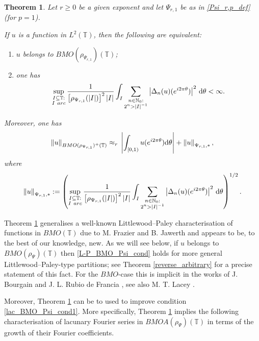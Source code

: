 \documentclass[a4paper, leqno, 10pt]{amsart}
\numberwithin{equation}{section}
\newtheorem{theo}[thm]{Theorem}
\newcommand{\dd}{\mathrm{d}}
\newcommand{\T}{\mathbb{T}}
\newcommand{\norm}[1]{\left\Vert#1\right\Vert}
\newcommand{\abs}[1]{\left|#1\right|}
\newcommand{\N}{\mathbb{N}}
\begin{document}
\begin{theo}\label{LP_BMO_Psi} Let $r \geq 0$ be a given exponent and let $\Psi_{r,1}$ be as in \eqref{Psi_r,p_def} (for $p=1$).  

If $u $ is a function in $ L^2 (\T)$, then the following are equivalent:
\begin{enumerate}
\item $u$ belongs to $BMO (\rho_{\Psi_{r,1}}) (\T)$;
\item one has
\begin{equation}\label{L-P_BMO_Psi_cond}
\sup_{\substack{I \subseteq \T: \\ I \ {\rm arc}}} \frac{1} { \left[ \rho_{\Psi_{r,1}} (|I|) \right]^2 |I|} \int_I \sum_{\substack{n \in \N_0: \\ 2^n > |I|^{-1}}} \left| \Delta_n (u) (e^{i 2 \pi \theta}) \right|^2 \, \dd \theta < \infty.
\end{equation}
\end{enumerate}
Moreover, one has 
\begin{equation}\label{equiv_norm_L-P_BMO_Psi}
\norm{u}_{BMO(\rho_{\Psi_{r,1}})^+ (\T)} \approx_{r} \\ \abs{ \int_{[0,1)} u (e^{i 2 \pi \theta}) \dd \theta} + \norm{u}_{\Psi_{r,1}, \ast} ,
\end{equation}
where
\[ 
\norm{u}_{\Psi_{r,1}, \ast}:= \left( \sup_{\substack{I \subseteq \T: \\ I \ {\rm arc}}} \frac{1} { \left[ \rho_{\Psi_{r,1}} (|I|) \right]^2 |I|} \int_I \sum_{\substack{n \in \N_0: \\ 2^n > |I|^{-1}}}  \left| \Delta_n (u) (e^{i 2 \pi \theta}) \right|^2 \, \dd \theta \right)^{1/2}.
\]
\end{theo}

Theorem \ref{LP_BMO_Psi} generalises a well-known Littlewood--Paley characterisation of functions in $BMO (\T)$ due to M. Frazier and B. Jawerth \cite{FJ} and appears to be, to the best of our knowledge, new. As we will see below, if $u$ belongs to $BMO (\rho_{\Psi}) (\T)$ then \eqref{L-P_BMO_Psi_cond} holds %
for more general Littlewood--Paley-type partitions; see  Theorem \ref{reverse_arbitrary}  
for a precise statement of this fact. For the $BMO$-case this is implicit in the works of J. Bourgain \cite{B_SF} and J. L. Rubio de Francia \cite{RdF}, see also M. T. Lacey  \cite{L}.

Moreover, Theorem \ref{LP_BMO_Psi} can be to used to improve condition \eqref{lac_BMO_Psi_cond1}. More specifically, Theorem \ref{LP_BMO_Psi} implies the following characterisation of lacunary Fourier series in $BMOA (\rho_{\Psi}) (\T)$ in terms of the growth of their Fourier coefficients.
\end{document}

